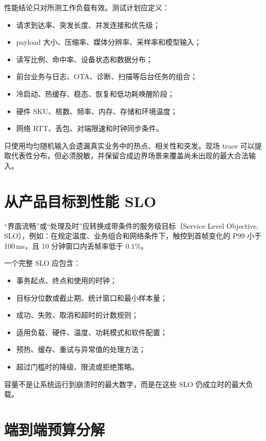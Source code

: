 性能结论只对所测工作负载有效。测试计划应定义：

\begin{itemize}
  \item 请求到达率、突发长度、并发连接和优先级；
  \item payload 大小、压缩率、媒体分辨率、采样率和模型输入；
  \item 读写比例、命中率、设备状态和数据分布；
  \item 前台业务与日志、OTA、诊断、扫描等后台任务的组合；
  \item 冷启动、热缓存、稳态、恢复和低功耗唤醒阶段；
  \item 硬件 SKU、核数、频率、内存、存储和环境温度；
  \item 网络 RTT、丢包、对端限速和时钟同步条件。
\end{itemize}

只使用均匀随机输入会遗漏真实业务中的热点、相关性和突发。现场 trace 可以提取代表性分布，但必须脱敏，并保留合成边界场景来覆盖尚未出现的最大合法输入。

\section{从产品目标到性能 SLO}

“界面流畅”或“处理及时”应转换成带条件的服务级目标（Service Level Objective, SLO），例如：在规定温度、业务组合和网络条件下，触控到首帧变化的 P99 小于 100\,ms，且 10 分钟窗口内丢帧率低于 0.1\%。

一个完整 SLO 应包含：

\begin{itemize}
  \item 事务起点、终点和使用的时钟；
  \item 目标分位数或截止期、统计窗口和最小样本量；
  \item 成功、失败、取消和超时的计数规则；
  \item 适用负载、硬件、温度、功耗模式和软件配置；
  \item 预热、缓存、重试与异常值的处理方法；
  \item 超过门槛时的降级、限流或拒绝策略。
\end{itemize}

容量不是让系统运行到崩溃时的最大数字，而是在这些 SLO 仍成立时的最大负载。

\section{端到端预算分解}

